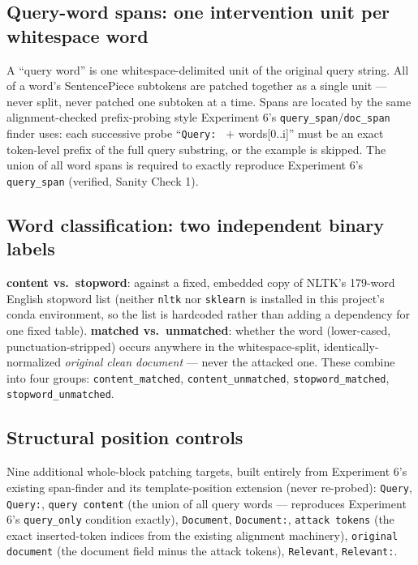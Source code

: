 \documentclass[11pt]{article}
\begin{document}
\subsection{Query-word spans: one intervention unit per whitespace word}

A ``query word'' is one whitespace-delimited unit of the original query string. All of a
word's SentencePiece subtokens are patched together as a single unit — never split,
never patched one subtoken at a time. Spans are located by the same alignment-checked
prefix-probing style Experiment 6's \texttt{query\_span}/\texttt{doc\_span} finder uses:
each successive probe ``\texttt{Query: } $+$ words[0..i]'' must be an exact token-level
prefix of the full query substring, or the example is skipped. The union of all word
spans is required to exactly reproduce Experiment 6's \texttt{query\_span} (verified,
Sanity Check 1).

\subsection{Word classification: two independent binary labels}

\textbf{content vs.\ stopword}: against a fixed, embedded copy of NLTK's 179-word
English stopword list (neither \texttt{nltk} nor \texttt{sklearn} is installed in this
project's conda environment, so the list is hardcoded rather than adding a dependency for
one fixed table). \textbf{matched vs.\ unmatched}: whether the word (lower-cased,
punctuation-stripped) occurs anywhere in the whitespace-split, identically-normalized
\emph{original clean document} — never the attacked one. These combine into four groups:
\texttt{content\_matched}, \texttt{content\_unmatched}, \texttt{stopword\_matched},
\texttt{stopword\_unmatched}.

\subsection{Structural position controls}

Nine additional whole-block patching targets, built entirely from Experiment 6's existing
span-finder and its template-position extension (never re-probed): \texttt{Query},
\texttt{Query:}, \texttt{query content} (the union of all query words — reproduces
Experiment 6's \texttt{query\_only} condition exactly), \texttt{Document},
\texttt{Document:}, \texttt{attack tokens} (the exact inserted-token indices from the
existing alignment machinery), \texttt{original document} (the document field minus the
attack tokens), \texttt{Relevant}, \texttt{Relevant:}.
\end{document}
